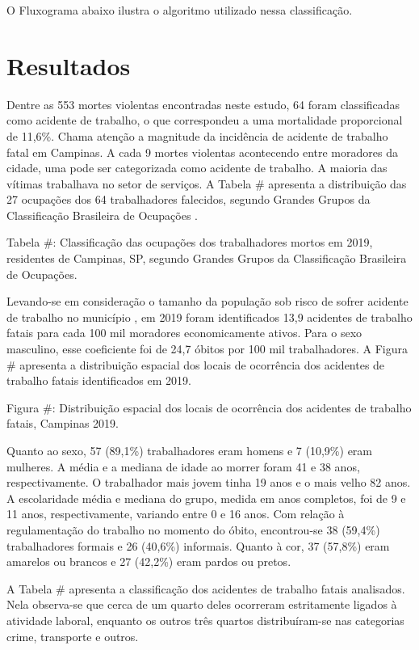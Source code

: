O Fluxograma abaixo ilustra o algoritmo utilizado nessa classificação.

\section{Resultados}

Dentre as 553 mortes violentas encontradas neste estudo, 64 foram classificadas como acidente de trabalho, o que correspondeu a uma mortalidade proporcional de 11,6\%. Chama atenção a magnitude da incidência de acidente de trabalho fatal em Campinas. A cada 9 mortes violentas acontecendo entre moradores da cidade, uma pode ser categorizada como acidente de trabalho. A maioria das vítimas trabalhava no setor de serviços. A Tabela \# apresenta a distribuição das 27 ocupações dos 64 trabalhadores falecidos, segundo Grandes Grupos da Classificação Brasileira de Ocupações \citep{MTE2016CBO}.

Tabela \#: Classificação das ocupações dos trabalhadores mortos em 2019, residentes de Campinas, SP, segundo Grandes Grupos da Classificação Brasileira de Ocupações.

Levando-se em consideração o tamanho da população sob risco de sofrer acidente de trabalho no município \citep{IBGE2020pop}, em 2019 foram identificados 13,9 acidentes de trabalho fatais para cada 100 mil moradores economicamente ativos. Para o sexo masculino, esse coeficiente foi de 24,7 óbitos por 100 mil trabalhadores. A Figura \# apresenta a distribuição espacial dos locais de ocorrência dos acidentes de trabalho fatais identificados em 2019.

Figura \#: Distribuição espacial dos locais de ocorrência dos acidentes de trabalho fatais, Campinas 2019.

Quanto ao sexo, 57 (89,1\%) trabalhadores eram homens e 7 (10,9\%) eram mulheres. A média e a mediana de idade ao morrer foram 41 e 38 anos, respectivamente. O trabalhador mais jovem tinha 19 anos e o mais velho 82 anos. A escolaridade média e mediana do grupo, medida em anos completos, foi de 9 e 11 anos, respectivamente, variando entre 0 e 16 anos. Com relação à regulamentação do trabalho no momento do óbito, encontrou-se 38 (59,4\%) trabalhadores formais e 26 (40,6\%) informais. Quanto à cor, 37 (57,8\%) eram amarelos ou brancos e 27 (42,2\%) eram pardos ou pretos.

A Tabela \# apresenta a classificação dos acidentes de trabalho fatais analisados. Nela observa-se que cerca de um quarto deles ocorreram estritamente ligados à atividade laboral, enquanto os outros três quartos distribuíram-se nas categorias crime, transporte e outros.

